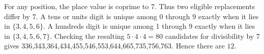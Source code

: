 For any position, the place value is coprime to 7. Thus two eligible replacements differ by 7. A tens or units digit is unique among 0 through 9 exactly when it lies in $\{3,4,5,6\}$. A hundreds digit is unique among 1 through 9 exactly when it lies in $\{3,4,5,6,7\}$. Checking the resulting $5\cdot4\cdot4=80$ candidates for divisibility by 7 gives 336,343,364,434,455,546,553,644,665,735,756,763. Hence there are $\boxed{12}$.
